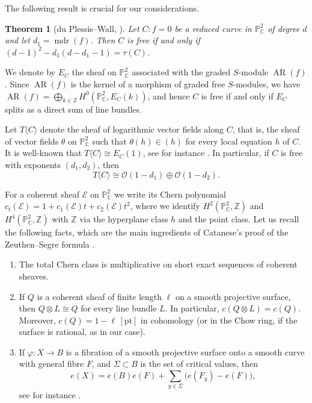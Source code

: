 \documentclass[11pt]{amsart}
\newtheorem{theorem}{Theorem}[section]
\theoremstyle{definition}
\numberwithin{equation}{section}
\newcommand{\PP}{\mathbb{P}}
\newcommand{\CC}{\mathbb{C}}
\newcommand{\ZZ}{\mathbb{Z}}
\newcommand{\cO}{\mathcal{O}}
\newcommand{\pt}{\mathrm{pt}}
\DeclareMathOperator{\AR}{AR}
\DeclareMathOperator{\mdr}{mdr}
\begin{document}
The following result is crucial for our considerations.

\begin{theorem}[du Plessis--Wall, \cite{dPW}]\label{thm:dPW}
Let $C\colon f=0$ be a reduced curve in $\PP^2_\CC$ of degree $d$ and let $d_1=\mdr(f)$.
Then $C$ is free if and only if $(d-1)^2-d_1(d-d_1-1)=\tau(C)$.
\end{theorem}

We denote by $E_C$ the sheaf on $\PP^2_\CC$ associated with the graded $S$-module $\AR(f)$.
Since $\AR(f)$ is the kernel of a morphism of graded free $S$-modules, we have $\AR(f)=\bigoplus_{k\in\ZZ}H^0(\PP^2_\CC,E_C(k))$, and hence $C$ is free if and only if $E_C$ splits as a direct sum of line bundles.

Let $T\langle C\rangle$ denote the sheaf of logarithmic vector fields along $C$,
that is, the sheaf of vector fields $\theta$ on $\PP^2_\CC$ such that
$\theta(h) \in (h)$ for every local equation $h$ of $C$.
It is well-known that $T\langle C\rangle \cong E_C(1)$, see for instance \cite{DS}. In particular,
if $C$ is free with exponents $(d_1, d_2)$, then
\[
  T\langle C\rangle \cong \cO(1-d_1) \oplus \cO(1-d_2).
\]

For a coherent sheaf $\mathcal E$ on $\PP^2_\CC$ we write its Chern polynomial $c_t(\mathcal E)=1+c_1(\mathcal E)t+c_2(\mathcal E)t^2$, where we identify $H^2(\PP^2_\CC,\ZZ)$ and $H^4(\PP^2_\CC,\ZZ)$ with $\ZZ$ via the hyperplane class $h$ and the point class.
Let us recall the following facts, which are the main ingredients of Catanese's proof of the Zeuthen--Segre formula \cite[Theorem~1.33]{BCP}.
\begin{enumerate}[label=\textup{(C\arabic*)},leftmargin=*]
\item\label{C1} The total Chern class is multiplicative on short exact sequences of coherent sheaves.
\item\label{C2} If $Q$ is a coherent sheaf of finite length $\ell$ on a smooth
projective surface, then $Q\otimes L\cong Q$ for every line bundle $L$. In particular,
$c(Q\otimes L)=c(Q)$. Moreover, $c(Q)=1-\ell\,[\pt]$ in cohomology
(or in the Chow ring, if the surface is rational, as in our case).
\item\label{C3} If $\varphi\colon X\to B$ is a fibration of a smooth projective surface onto a smooth curve with general fibre $F$, and $\Sigma\subset B$ is the set of critical values, then
\[
e(X)=e(B)e(F)+\sum_{y\in\Sigma}\bigl(e(F_y)-e(F)\bigr),
\]
see for instance \cite[Chapter~III, Section~11]{BHPV}.
\end{enumerate}
\end{document}

